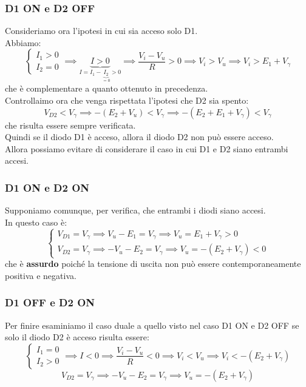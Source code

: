 \documentclass[../main.tex]{subfiles}
\begin{document}
	\subsubsection{D1 ON e D2 OFF}
	Consideriamo ora l’ipotesi in cui sia acceso solo D1. \\
	Abbiamo:
	$$\begin{cases} I_1 > 0 \\ 
		I_2 = 0 \end{cases} \implies \underbrace{I > 0}_{I = I_1 - \underbrace{I_2}_{=0} > 0} \implies \frac{V_i - V_u}{R} > 0 \implies V_i > V_u \implies V_i > E_1 + V_\gamma$$
	che è complementare a quanto ottenuto in precedenza. \\
	Controllaimo ora che venga rispettata l’ipotesi che D2 sia spento:
	$$V_{D2} < V_\gamma \implies -(E_2 + V_u) < V_\gamma \implies -(E_2 + E_1 + V_\gamma) < V_\gamma$$
	che risulta essere sempre verificata. \\
	Quindi se il diodo D1 è acceso, allora il diodo D2 non può essere acceso. \\
	Allora possiamo evitare di considerare il caso in cui D1 e D2 siano entrambi accesi.
	\subsubsection{D1 ON e D2 ON}
	Supponiamo comunque, per verifica, che entrambi i diodi siano accesi.\\
	In questo caso è:
	$$\begin{cases} V_{D1} = V_\gamma \implies V_u - E_1 = V_\gamma \implies V_u = E_1 + V_\gamma > 0 \\ 
		V_{D2} = V_\gamma \implies -V_u - E_2 = V_\gamma \implies V_u = -(E_2 + V_\gamma) < 0 \end{cases}$$
	che è \textbf{assurdo} poiché la tensione di uscita non può essere contemporaneamente positiva e negativa.
	\subsubsection{D1 OFF e D2 ON}
	Per finire esaminiamo il caso duale a quello visto nel caso D1 ON e D2 OFF se solo il diodo D2 è acceso risulta essere:
	$$\begin{cases} I_1 = 0 \\ 
		I_2 > 0 \end{cases} \implies I < 0 \implies \frac{V_i - V_u}{R} < 0 \implies V_i < V_u \implies V_i < -(E_2 + V_\gamma)$$
	$$V_{D2} = V_\gamma \implies -V_u - E_2 = V_\gamma \implies V_u = -(E_2 + V_\gamma)$$
\end{document}

